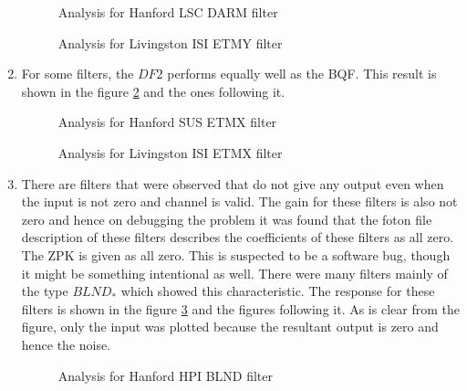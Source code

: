 \documentclass[colorlinks=true,pdfstartview=FitV,linkcolor=blue,
            citecolor=red,urlcolor=magenta]{ligodoc}
\begin{document}
\begin{enumerate}
\begin{figure}[H]
			  \centering
			  \def\svgscale{0.5}
			  \tiny{
			  
			  }
			  \caption{Analysis for Hanford LSC DARM filter}
			 \label{dfbad}
		\end{figure}
		\begin{figure}[H]
 
			  \centering
			  \def\svgscale{0.5}
			  \tiny{
			  
			  }
			  \caption{Analysis for Livingston ISI ETMY filter}
		\end{figure}
		
		\item For some filters, the $DF2$ performs equally well as the BQF. This result is shown in the figure \ref{bqfdf} and the ones following it.
		\begin{figure}[htbp]
 
			  \centering
			  \def\svgscale{0.5}
			  \tiny{
			  
			  }
			  \caption{Analysis for Hanford SUS ETMX filter}
			 \label{bqfdf}
		\end{figure}
		\begin{figure}[H]
 
			  \centering
			  \def\svgscale{0.5}
			  \tiny{
			  
			  }
			  \caption{Analysis for Livingston ISI ETMX filter}
		\end{figure}
		\item There are filters that were observed that do not give any output even when the input is not zero and channel is valid. The gain for these filters is also not zero and hence on debugging the problem it was found that the foton file description of these filters describes the coefficients of these filters as all zero. The ZPK is given as all zero. This is suspected to be a software bug, though it might be something intentional as well. There were many filters mainly of the type $BLND_*$ which showed this characteristic. The response for these filters is shown in the figure \ref{blnd} and the figures following it. As is clear from the figure, only the input was plotted because the resultant output is zero and hence the noise. 
		\begin{figure}[H]
 
			  \centering
			  \def\svgscale{0.5}
			  \tiny{
			  
			  }
			  \caption{Analysis for Hanford HPI BLND filter}
			 \label{blnd}
		\end{figure}
		\begin{figure}[H]
 

\end{figure}
\end{enumerate}
\end{document}
